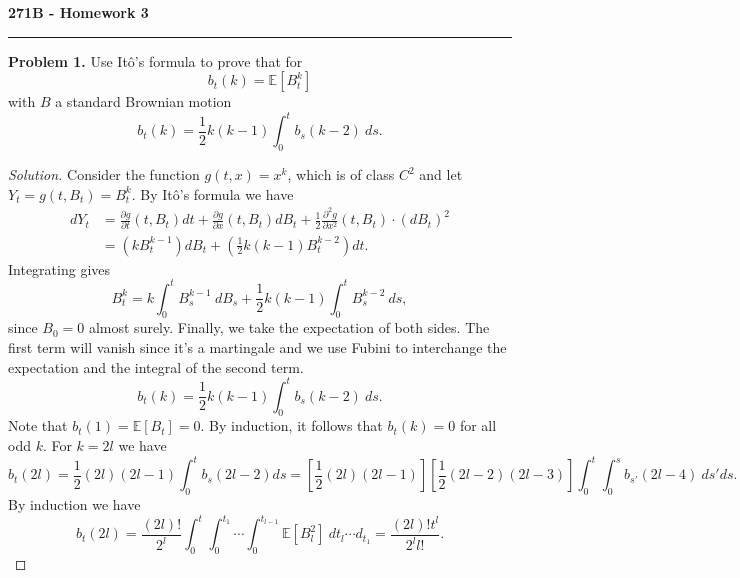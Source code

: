 \documentclass[11pt,letterpaper]{report}
\newcommand{\E}{\mathbb{E}}
\newenvironment{solution}
{\begin{proof}[Solution]}
{\end{proof}}
\begin{document}
\begin{center}
{\bf \Large 271B - Homework 3}
\vspace{0.2cm}
\hrule
\end{center}

\noindent\textbf{Problem 1. }
Use It\^o's formula to prove that for
\[
b_t(k) = \E[B_t^k]
\]
with $B$ a standard Brownian motion
\[
b_t(k) = \frac{1}{2}k(k-1)\int_0^tb_s(k-2)\ ds.
\]
\begin{solution}
	Consider the function $g(t, x) = x^k$, which is of class $C^2$ and let $Y_t = g(t, B_t) = B_t^k$. By It\^o's formula we have
	\begin{align*}
		dY_t &= \frac{\partial g}{\partial t}(t, B_t)dt + \frac{\partial g}{\partial x}(t, B_t)dB_t + \frac{1}{2}\frac{\partial^2g}{\partial x^2}(t, B_t)\cdot (dB_t)^2\\
		&= (kB^{k-1}_t)dB_t + \left(\frac{1}{2}k(k-1)B_t^{k-2}\right)dt.
	\end{align*}
	Integrating gives
	\[
	B_t^k = k\int_0^tB_s^{k-1}\ dB_s + \frac{1}{2}k(k-1)\int_0^tB_s^{k-2}\ ds,
	\]
	since $B_0 = 0$ almost surely. Finally, we take the expectation of both sides. The first term will vanish since it's a martingale and we use Fubini to interchange the expectation and the integral of the second term.
	\[
	b_t(k) = \frac{1}{2}k(k-1)\int_0^tb_s(k-2)\ ds.
	\]
	Note that $b_t(1) = \E[B_t] = 0$. By induction, it follows that $b_t(k) = 0$ for all odd $k$. For $k = 2l$ we have 
	\[
	b_t(2l) = \frac{1}{2}(2l)(2l-1)\int_0^tb_s(2l-2)ds = \left[\frac{1}{2}(2l)(2l-1)\right]\left[\frac{1}{2}(2l-2)(2l-3)\right]\int_0^t\int_0^sb_{s'}(2l-4)\ ds'ds.
	\]
	By induction we have
	\[
	b_t(2l) = \frac{(2l)!}{2^l}\int_0^{t}\int_0^{t_1}\cdots \int_0^{t_{l-1}}\E[B_l^2]\ dt_l\cdots d_{t_1} = \frac{(2l)!t^l}{2^ll!}.
	\]
\end{solution}
\end{document}
